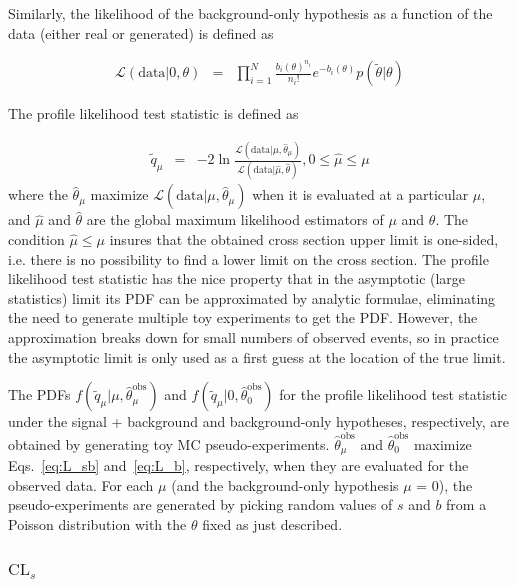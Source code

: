 \documentclass[dissertation.tex]{subfiles}
\begin{document}
Similarly, the likelihood of the background-only hypothesis as a function of the data (either real or generated) is defined as 

\begin{eqnarray}
\label{eq:L_b}
\mathcal{L}(\mbox{data} | 0, \theta) &=& \prod_{i = 1}^{N} \frac{b_{i}(\theta)^{n_{i}}}{n_{i}!}e^{- b_{i}(\theta)}p(\tilde{\theta} | \theta)
\end{eqnarray}

The profile likelihood test statistic is defined as 

\begin{eqnarray}
\label{eq:profile_likelihood}
\tilde{q}_{\mu} &=& -2\ln\frac{\mathcal{L}(\mbox{data} | \mu, \hat{\theta}_{\mu})}{\mathcal{L}(\mbox{data} | \hat{\mu}, \hat{\theta})}, 0 \leq \hat{\mu} \leq \mu
\end{eqnarray}
%
where the $\hat{\theta}_{\mu}$ maximize $\mathcal{L}(\mbox{data} | \mu, \hat{\theta}_{\mu})$ when it is evaluated at a particular $\mu$, and $\hat{\mu}$ and $\hat{\theta}$ are the global maximum likelihood estimators of $\mu$ and $\theta$.  The condition $\hat{\mu} \leq \mu$ insures that the obtained cross section upper limit is one-sided, i.e. there is no possibility to find a lower limit on the cross section.  The profile likelihood test statistic has the nice property that in the asymptotic (large statistics) limit its PDF can be approximated by analytic formulae, eliminating the need to generate multiple toy experiments to get the PDF.  However, the approximation breaks down for small numbers of observed events, so in practice the asymptotic limit is only used as a first guess at the location of the true limit.

The PDFs $f(\tilde{q}_{\mu} | \mu, \hat{\theta}_{\mu}^{\mathrm{obs}})$ and $f(\tilde{q}_{\mu} | 0, \hat{\theta}_{0}^{\mathrm{obs}})$ for the profile likelihood test statistic under the signal + background and background-only hypotheses, respectively, are obtained by generating toy MC pseudo-experiments.  $\hat{\theta}_{\mu}^{\mathrm{obs}}$ and $\hat{\theta}_{0}^{\mathrm{obs}}$ maximize Eqs.~\ref{eq:L_sb} and~\ref{eq:L_b}, respectively, when they are evaluated for the observed data.  For each $\mu$ (and the background-only hypothesis $\mu$ = 0), the pseudo-experiments are generated by picking random values of $s$ and $b$ from a Poisson distribution with the $\theta$ fixed as just described.

\subsubsection{$\mbox{CL}_{s}$}
\label{sec:CLs}
\end{document}
